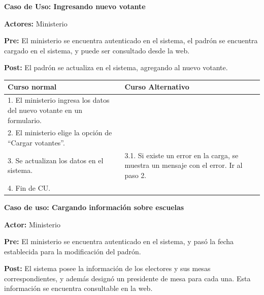 \textbf{Caso de Uso: Ingresando nuevo votante}

\textbf{Actores:} Ministerio

\textbf{Pre:} El ministerio se encuentra autenticado en el sistema, el padrón se encuentra cargado en el sistema, y puede ser consultado desde la web.

\textbf{Post:} El padrón se actualiza en el sistema, agregando al nuevo votante.
\begin{table}[h!]
	
 \begin{tabular}{|p{7.5cm} | p{7.5cm}|} 
 \hline
 \textbf{Curso normal} & \textbf{Curso Alternativo} \\
 \hline

1. El ministerio ingresa los datos del nuevo votante en un formulario. & \\
\hline

2. El ministerio elige la opción de “Cargar votantes”. & \\
\hline

3. Se actualizan los datos en el sistema. & 3.1. Si existe un error en la carga, se muestra un mensaje con el error. Ir al paso 2. \\
\hline
4. Fin de CU. & \\
 \hline
 \end{tabular}

\end{table}

\textbf{Caso de uso: Cargando información sobre escuelas}

\textbf{Actor:} Ministerio

\textbf{Pre:} El ministerio se encuentra autenticado en el sistema, y pasó la fecha establecida para la modificación del padrón.

\textbf{Post:} El sistema posee la información de los electores y sus mesas correspondientes, y además designó un presidente de mesa para cada una. Esta información se encuentra consultable en la web.


